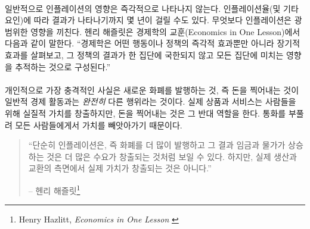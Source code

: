 \paragraph{}
일반적으로 인플레이션의 영향은 즉각적으로 나타나지 않는다. 
인플레이션율(및 기타 요인)에 따라 결과가 나타나기까지 몇 년이 걸릴 수도 있다. 
무엇보다 인플레이션은 광범위한 영향을 끼친다. 
헨리 해즐릿은 경제학의 교훈(Economics in One Lesson)에서 다음과 같이 말한다. 
\enquote{경제학은 어떤 행동이나 정책의 즉각적 효과뿐만 아니라 장기적 효과를 살펴보고, 
	그 정책의 결과가 한 집단에 국한되지 않고 모든 집단에 미치는 영향을 추적하는 것으로 구성된다.}


\paragraph{}
개인적으로 가장 충격적인 사실은 새로운 화폐를 발행하는 것, 즉 돈을 찍어내는 것이 
일반적 경제 활동과는 \textit{완전히} 다른 행위라는 것이다. 
실제 상품과 서비스는 사람들을 위해 실질적 가치를 창출하지만, 
돈을 찍어내는 것은 그 반대 역할을 한다. 통화를 부풀려 모든 사람들에게서 가치를 빼앗아가기 때문이다. 

\begin{quotation}\begin{samepage}
		\enquote{단순히 인플레이션은, 즉 화폐를 더 많이 발행하고 그 결과 임금과 물가가 상승하는 것은 
		더 많은 수요가 창출되는 것처럼 보일 수 있다. 하지만, 실제 생산과 교환의 측면에서 실제 가치가 창출되는 것은 아니다.}
		\begin{flushright} -- 헨리 해즐릿\footnote{Henry Hazlitt, \textit{Economics in One Lesson} \cite{hazlitt}}
\end{flushright}\end{samepage}\end{quotation}

